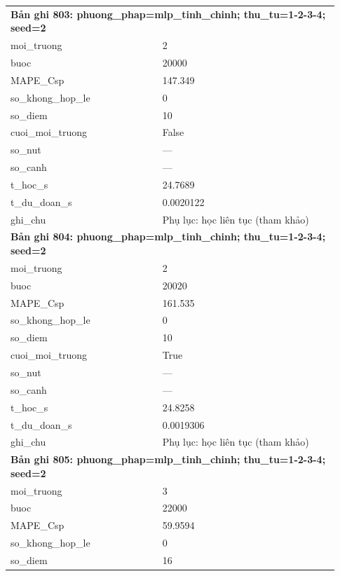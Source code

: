 \begin{longtable}{p{0.43\linewidth}p{0.50\linewidth}}
\midrule
\multicolumn{2}{p{0.95\linewidth}}{\textbf{Bản ghi 803: phuong\_phap=mlp\_tinh\_chinh; thu\_tu=1-2-3-4; seed=2}} \\
moi\_\allowbreak truong & 2 \\
buoc & 20000 \\
MAPE\_\allowbreak Csp & 147.349 \\
so\_\allowbreak khong\_\allowbreak hop\_\allowbreak le & 0 \\
so\_\allowbreak diem & 10 \\
cuoi\_\allowbreak moi\_\allowbreak truong & False \\
so\_\allowbreak nut & — \\
so\_\allowbreak canh & — \\
t\_\allowbreak hoc\_\allowbreak s & 24.7689 \\
t\_\allowbreak du\_\allowbreak doan\_\allowbreak s & 0.0020122 \\
ghi\_\allowbreak chu & Phụ lục: học liên tục (tham khảo) \\
\midrule
\multicolumn{2}{p{0.95\linewidth}}{\textbf{Bản ghi 804: phuong\_phap=mlp\_tinh\_chinh; thu\_tu=1-2-3-4; seed=2}} \\
moi\_\allowbreak truong & 2 \\
buoc & 20020 \\
MAPE\_\allowbreak Csp & 161.535 \\
so\_\allowbreak khong\_\allowbreak hop\_\allowbreak le & 0 \\
so\_\allowbreak diem & 10 \\
cuoi\_\allowbreak moi\_\allowbreak truong & True \\
so\_\allowbreak nut & — \\
so\_\allowbreak canh & — \\
t\_\allowbreak hoc\_\allowbreak s & 24.8258 \\
t\_\allowbreak du\_\allowbreak doan\_\allowbreak s & 0.0019306 \\
ghi\_\allowbreak chu & Phụ lục: học liên tục (tham khảo) \\
\midrule
\multicolumn{2}{p{0.95\linewidth}}{\textbf{Bản ghi 805: phuong\_phap=mlp\_tinh\_chinh; thu\_tu=1-2-3-4; seed=2}} \\
moi\_\allowbreak truong & 3 \\
buoc & 22000 \\
MAPE\_\allowbreak Csp & 59.9594 \\
so\_\allowbreak khong\_\allowbreak hop\_\allowbreak le & 0 \\
so\_\allowbreak diem & 16 \\

\end{longtable}
